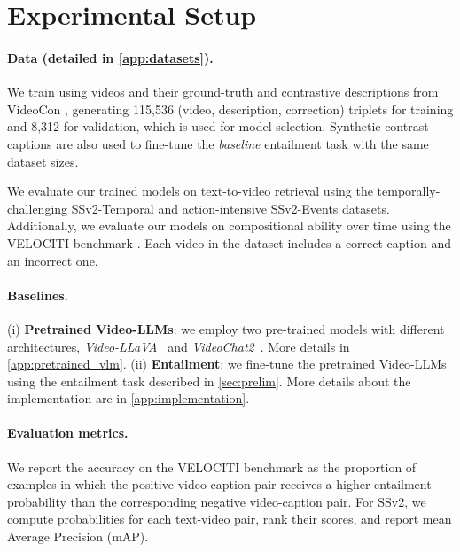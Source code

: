 \section{Experimental Setup}
\label{sec:exp_setup}

\paragraph{Data (detailed in \autoref{app:datasets}).}

We train \method{} using videos and their ground-truth and contrastive descriptions from VideoCon \cite{bansal2024videocon}, generating 115,536 (video, description, correction) triplets for training and 8,312 for validation, which is used for model selection. Synthetic contrast captions are also used to fine-tune the \textit{baseline} entailment task with the same dataset sizes.

We evaluate our trained models on text-to-video retrieval using the temporally-challenging SSv2-Temporal \cite{sevilla2021only} and action-intensive SSv2-Events \cite{bagad2023test}  datasets.
Additionally, we evaluate our models on 
compositional ability over time using the VELOCITI benchmark \cite{saravanan2024velociti}. Each video in the dataset includes a correct caption and an incorrect one.


\paragraph{Baselines.}
(i) \textbf{Pretrained Video-LLMs}:
we employ two pre-trained models with different architectures, \textit{Video-LLaVA}~\cite{lin2023video} 
and
\textit{VideoChat2}~\cite{li2023videochat}. 
More details in \autoref{app:pretrained_vlm}.
(ii) \textbf{Entailment}:
we fine-tune the pretrained Video-LLMs using the entailment task described in \autoref{sec:prelim}. 
More details about the implementation are in \autoref{app:implementation}.


\paragraph{Evaluation metrics.}

We report the accuracy on the VELOCITI benchmark as the proportion of examples in which the positive video-caption pair receives a higher  entailment probability than the corresponding negative video-caption pair.
For SSv2, we compute  probabilities for each text-video pair, rank their scores, and report mean Average Precision (mAP).





